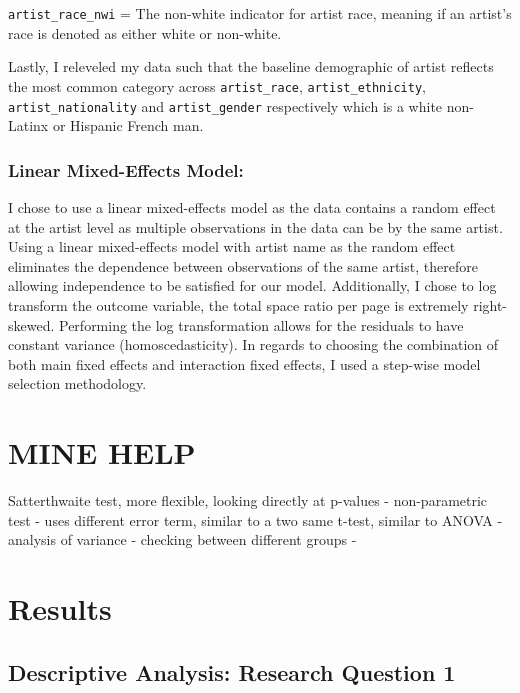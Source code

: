 \documentclass[
  letterpaper,
  DIV=11,
  numbers=noendperiod]{scrreprt}
\begin{document}
\texttt{artist\_race\_nwi} = The non-white indicator for artist race,
meaning if an artist's race is denoted as either white or non-white.

Lastly, I releveled my data such that the baseline demographic of artist
reflects the most common category across \texttt{artist\_race},
\texttt{artist\_ethnicity}, \texttt{artist\_nationality} and
\texttt{artist\_gender} respectively which is a white non-Latinx or
Hispanic French man.

\hypertarget{linear-mixed-effects-model}{%
\subsection{Linear Mixed-Effects
Model:}\label{linear-mixed-effects-model}}

I chose to use a linear mixed-effects model as the data contains a
random effect at the artist level as multiple observations in the data
can be by the same artist. Using a linear mixed-effects model with
artist name as the random effect eliminates the dependence between
observations of the same artist, therefore allowing independence to be
satisfied for our model. Additionally, I chose to log transform the
outcome variable, the total space ratio per page is extremely
right-skewed. Performing the log transformation allows for the residuals
to have constant variance (homoscedasticity). In regards to choosing the
combination of both main fixed effects and interaction fixed effects, I
used a step-wise model selection methodology.

\hypertarget{mine-help-1}{%
\chapter{MINE HELP}\label{mine-help-1}}

Satterthwaite test, more flexible, looking directly at p-values -
non-parametric test - uses different error term, similar to a two same
t-test, similar to ANOVA - analysis of variance - checking between
different groups -

\hypertarget{results}{%
\chapter{Results}\label{results}}

\hypertarget{descriptive-analysis-research-question-1}{%
\section{Descriptive Analysis: Research Question
1}\label{descriptive-analysis-research-question-1}}
\end{document}
